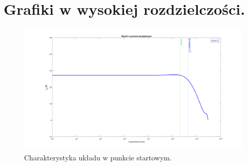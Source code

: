 \documentclass{article}
\begin{document}
\pagebreak









\clearpage
\section{Grafiki w wysokiej rozdzielczości.}


\begin{landscape}
	\begin{figure}[h]
		\vspace*{-2cm}
		\includegraphics[width=25cm,height=15 cm]{graphics/starting_point.png}
		\centering
		\caption{Charakterystyka układu w punkcie startowym.}
	\end{figure}
\end{landscape}
\end{document}
